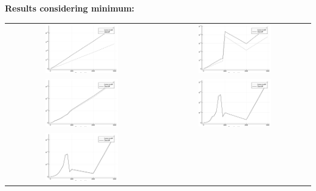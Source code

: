 \documentclass[a4paper,11pt]{article}
\begin{document}
\newpage
\bf{Results considering minimum:}\\

\begin{tabular}{cc}
	\includegraphics[width=0.5\textwidth]{perf_minimum_3} & 
	\includegraphics[width=0.5\textwidth]{perf_minimum_10} \\
	\includegraphics[width=0.5\textwidth]{perf_minimum_100} &
	\includegraphics[width=0.5\textwidth]{perf_minimum_500} \\
	\includegraphics[width=0.5\textwidth]{perf_minimum_1000} &
\end{tabular}
\end{document}

